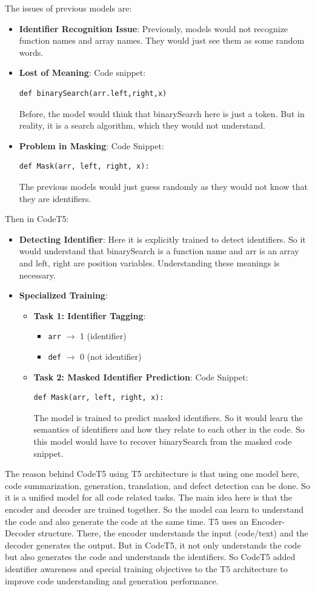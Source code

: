 \documentclass[12pt]{article}
\begin{document}
The issues of previous models are:
\begin{itemize}
	\item \textbf{Identifier Recognition Issue}: Previously, models would not recognize function names and array names. They would just see them as some random words.
	\item \textbf{Lost of Meaning}: Code snippet:
	\begin{lstlisting}
def binarySearch(arr.left,right,x)
	\end{lstlisting}
	Before, the model would think that binarySearch here is just a token. But in reality, it is a search algorithm, which they would not understand.
	\item \textbf{Problem in Masking}: Code Snippet:
	\begin{lstlisting}
def Mask(arr, left, right, x):
	\end{lstlisting}
	The previous models would just guess randomly as they would not know that they are identifiers.
\end{itemize}
Then in CodeT5:
\begin{itemize}
	\item \textbf{Detecting Identifier}: Here it is explicitly trained to detect identifiers. So it would understand that binarySearch is a function name and arr is an array and left, right are position variables. Understanding these meanings is necessary.
	\item \textbf{Specialized Training}:
		\begin{itemize}
			\item \textbf{Task 1: Identifier Tagging}:
			\begin{itemize}
				\item \texttt{arr} $\rightarrow$ 1 (identifier)
				\item \texttt{def} $\rightarrow$ 0 (not identifier)
			\end{itemize}
			\item \textbf{Task 2: Masked Identifier Prediction}:
			Code Snippet:
			\begin{lstlisting}
def Mask(arr, left, right, x):
			\end{lstlisting}
			The model is trained to predict masked identifiers. So it would learn the semantics of identifiers and how they relate to each other in the code. So this model would have to recover binarySearch from the masked code snippet.
		\end{itemize}
\end{itemize}
The reason behind CodeT5 using T5 architecture is that using one model here, code summarization, generation, translation, and defect detection can be done. So it is a unified model for all code related tasks. The main idea here is that the encoder and decoder are trained together. So the model can learn to understand the code and also generate the code at the same time. T5 uses an Encoder-Decoder structure. There, the encoder understands the input (code/text) and the decoder generates the output. But in CodeT5, it not only understands the code but also generates the code and understands the identifiers. So CodeT5 added identifier awareness and special training objectives to the T5 architecture to improve code understanding and generation performance.
\end{document}
